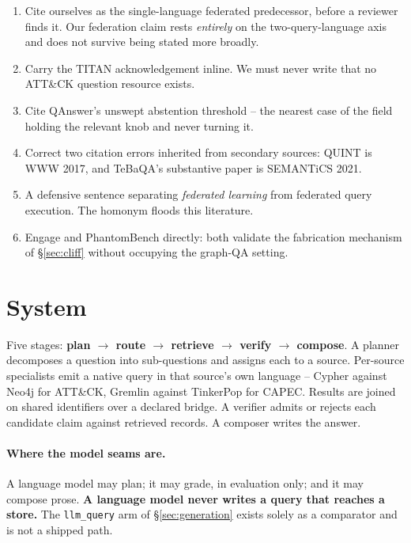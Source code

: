 \documentclass{article}
\newcommand{\claimref}[1]{\iftoggle{trace}{\,{\scriptsize\textcolor{gray}{\texttt{<#1>}}}}{}}
\begin{document}
\begin{enumerate}
\item Cite \citet{emonet2024} ourselves as the single-language federated
      predecessor, before a reviewer finds it. Our federation claim rests
      \emph{entirely} on the two-query-language axis and does not survive being
      stated more broadly.\claimref{C-024}
\item Carry the TITAN acknowledgement inline. We must never write that no ATT\&CK
      question resource exists.\claimref{C-025}
\item Cite QAnswer's unswept abstention threshold -- the nearest case of the field
      holding the relevant knob and never turning it.
\item Correct two citation errors inherited from secondary sources: QUINT is WWW
      2017, and TeBaQA's substantive paper is SEMANTiCS 2021.
\item A defensive sentence separating \emph{federated learning} from federated
      query execution. The homonym floods this literature.
\item Engage \citet{deceptive2026} and PhantomBench directly: both validate the
      fabrication mechanism of \S\ref{sec:cliff} without occupying the graph-QA
      setting.
\end{enumerate}

\section{System}
\label{sec:system}

Five stages: \textbf{plan $\rightarrow$ route $\rightarrow$ retrieve
$\rightarrow$ verify $\rightarrow$ compose}. A planner decomposes a question into
sub-questions and assigns each to a source. Per-source specialists emit a native
query in that source's own language -- Cypher against Neo4j for ATT\&CK, Gremlin
against TinkerPop for CAPEC. Results are joined on shared identifiers over a
declared bridge. A verifier admits or rejects each candidate claim against
retrieved records. A composer writes the answer.

\paragraph{Where the model seams are.} A language model may plan; it may grade,
in evaluation only; and it may compose prose. \textbf{A language model never
writes a query that reaches a store.}\claimref{C-007} The \texttt{llm\_query} arm
of \S\ref{sec:generation} exists solely as a comparator and is not a shipped
path.
\end{document}
